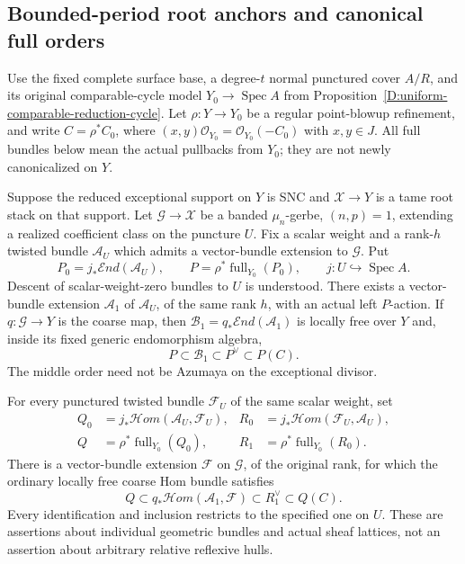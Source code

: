 \subsection{Bounded-period root anchors and canonical full orders}

\begin{proposition}
\label{D:stable-root-anchor-canonical-comparison}
Use the fixed complete surface base, a degree-$t$ normal punctured
cover $A/R$, and its original comparable-cycle model
$Y_0\to\operatorname{Spec}A$ from
Proposition~\ref{D:uniform-comparable-reduction-cycle}.
Let $\rho:Y\to Y_0$ be a regular point-blowup refinement, and
write $C=\rho^*C_0$, where
$(x,y)\mathcal O_{Y_0}=\mathcal O_{Y_0}(-C_0)$ with $x,y\in J$.
All full bundles below mean the actual pullbacks from $Y_0$;
they are not newly canonicalized on $Y$.

Suppose the reduced exceptional support on $Y$ is SNC and
$\mathcal X\to Y$ is a tame root stack on that support. Let
$\mathcal G\to\mathcal X$ be a banded $\mu_n$-gerbe,
$(n,p)=1$, extending a realized coefficient class on the
puncture $U$. Fix a scalar weight and a rank-$h$ twisted
bundle $\mathcal A_U$ which admits a vector-bundle extension
to $\mathcal G$. Put
\[
 P_0=j_*\mathcal End(\mathcal A_U),\qquad
 P=\rho^*\operatorname{full}_{Y_0}(P_0),
 \qquad j:U\hookrightarrow\operatorname{Spec}A.
                                                        \tag{D.BA.1}
\]
Descent of scalar-weight-zero bundles to $U$ is understood.
There exists a vector-bundle extension $\mathcal A_1$ of
$\mathcal A_U$, of the same rank $h$, with an actual left
$P$-action. If $q:\mathcal G\to Y$ is the coarse map, then
$\mathcal B_1=q_*\mathcal End(\mathcal A_1)$ is locally free
over $Y$ and, inside its fixed generic endomorphism algebra,
\[
                  P\subset\mathcal B_1\subset P^\vee
                             \subset P(C).             \tag{D.BA.2}
\]
The middle order need not be Azumaya on the exceptional divisor.

For every punctured twisted bundle $\mathcal F_U$ of the
same scalar weight, set
\[
 \begin{aligned}
 Q_0&=j_*\mathcal Hom(\mathcal A_U,\mathcal F_U),&
 R_0&=j_*\mathcal Hom(\mathcal F_U,\mathcal A_U),\\
 Q&=\rho^*\operatorname{full}_{Y_0}(Q_0),&
 R_1&=\rho^*\operatorname{full}_{Y_0}(R_0).
 \end{aligned}                                           \tag{D.BA.3}
\]
There is a vector-bundle extension $\mathcal F$ on
$\mathcal G$, of the original rank, for which the ordinary
locally free coarse Hom bundle satisfies
\[
 Q\subset q_*\mathcal Hom(\mathcal A_1,\mathcal F)
       \subset R_1^\vee\subset Q(C).                  \tag{D.BA.4}
\]
Every identification and inclusion restricts to the specified
one on $U$. These are assertions about individual geometric
bundles and actual sheaf lattices, not an assertion about
arbitrary relative reflexive hulls.
\end{proposition}

